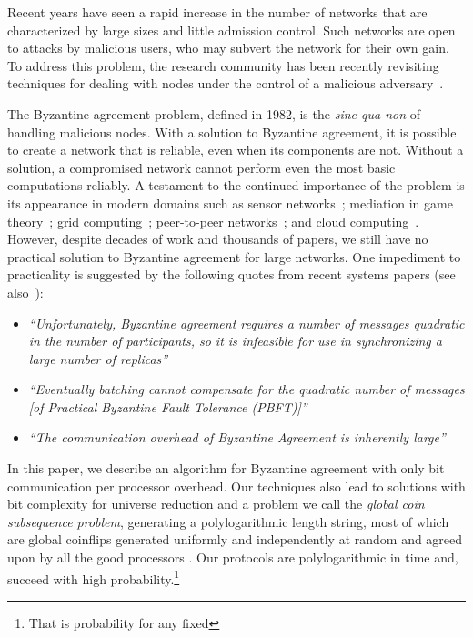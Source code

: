 \documentclass[letterpaper,11pt]{article}
\begin{document}
Recent years have seen a rapid increase in the number of networks that are characterized by large sizes and little admission control.  Such networks are open to attacks by malicious users, who may subvert the network for their own gain.  To address this problem, the research community has been recently revisiting techniques for dealing with nodes under the control of a malicious adversary~\cite{kotla2007zyzzyva,clement-making,1529992,anderson2002worldwide}.

The Byzantine agreement problem, defined in 1982, is the \emph{sine qua non} of handling malicious nodes.   With a solution to Byzantine agreement, it is possible to create a network that is reliable, even when its components are not.  Without a solution, a compromised network cannot perform even the most basic computations reliably.  A testament to the continued importance of the problem is its appearance in modern domains such as sensor networks~\cite{shi2004designing}; mediation in game theory~\cite{ADGH,ADH}; grid computing~\cite{anderson2002worldwide}; peer-to-peer networks~\cite{rhea2003pond}; and cloud computing~\cite{wright2009contemporary}.  However, despite decades of work and thousands of papers, we still have no practical solution to Byzantine agreement for large networks.  One impediment to practicality is suggested by the following quotes from recent systems papers (see also~\cite{castro2002practical,Malkhi97unreliableintrusion,amir2006scaling,agbaria2003overcoming,1098025}):

\begin{itemize}
\item \emph{``Unfortunately, Byzantine agreement requires a number of messages quadratic in the number of participants, so it is infeasible for use in synchronizing a large number of replicas''}~\cite{rhea2003pond}

\item \emph{``Eventually batching cannot compensate for the quadratic number of messages [of Practical Byzantine Fault Tolerance (PBFT)]''}~\cite{CMLRS}

\item \emph{``The communication overhead of Byzantine Agreement is inherently large''}~\cite{Cheng2009219}

\end{itemize}

In this paper, we describe an algorithm for Byzantine agreement with only  bit communication per processor overhead.  
Our  techniques also lead to solutions with  bit complexity for universe reduction and a problem we call  the {\it  global coin subsequence problem},  generating a polylogarithmic length string, most of which are global coinflips generated uniformly and independently at random and agreed upon by all the good processors .  Our protocols are polylogarithmic in time and, succeed with high probability.\footnote{That is probability  for any fixed }
\end{document}
